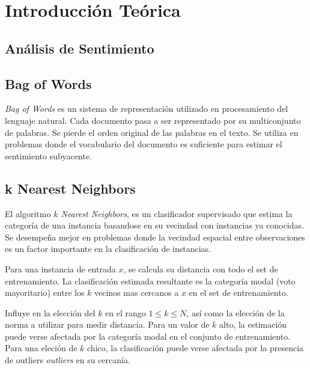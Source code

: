 \section{Introducción Teórica}%
\label{sec:introduccion_teorica}

\subsection{Análisis de Sentimiento}%
\label{sub:analisis_de_sentimiento}

\subsection{Bag of Words}%
\label{sub:bag_of_words}

\textit{Bag of Words} es un sistema de representación utilizado en
procesamiento del lenguaje natural. Cada documento pasa a ser representado por
su multiconjunto de palabras. Se pierde el orden original de las palabras en el
texto. Se utiliza en problemas donde el vocabulario del documento es suficiente
para estimar el sentimiento subyacente.



\subsection{k Nearest Neighbors}%
\label{sub:k_nearest_neighbors}

El algoritmo \textit{$k$ Nearest Neighbors}, \knn{} es un clasificador
supervisado que estima la categoría de una instancia basandose en su vecindad
con instancias ya conocidas.
Se desempeña mejor en problemas donde la vecindad espacial entre
observaciones es un factor importante en la clasificación de instancias.

Para una instancia de entrada $x$, se calcula su distancia con todo el set de
entrenamiento. La clasificación estimada resultante es la categoría modal (voto
mayoritario) entre los $k$ vecinos mas cercanos a $x$ en el set de
entrenamiento.

Influye en \knn{} la elección del $k$ en el rango $1 \leq k \leq N$, así como
la elección de la norma a utilizar para medir distancia.
Para un valor de $k$ alto, la estimación puede verse afectada por la categoría
modal en el conjunto de entrenamiento.
Para una eleción de $k$ chico, la clasificación puede verse afectada por la
presencia de outliers \textit{outliers} en su cercanía.

